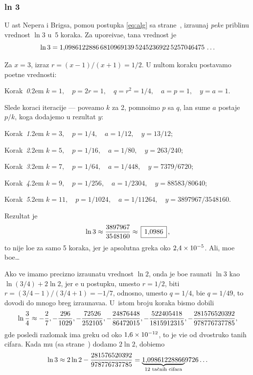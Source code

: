 \subsubsection{ln 3}\label{sssec:ln3}
 
\zadatak
U {\cv}ast Nepera i Brigsa,
pomo{\cc}u postupka \eqref{eq:alg} sa 
strane~\pageref{eq:alg},
izra{\cv}unaj {\sl pe{\sv}ke\/} pribli{\zv}nu vrednost $\ln 3$
u~5 koraka. Za upore{\dj}iva{\nj}e, ta{\cv}na vrednost je
$$
\ln3=1\.
0986122886\,
6810969139\,
5245236922\,
5257046475\,\ldots
$$

\def\step#1{\par\indent\leavevmode
  Korak~{\it#1}.\kern2em\relax}

\resenje
Za $x=3$, izraz $r=(x-1)/(x+1)=1/2$. U nultom koraku postav{\lj}amo po{\cv}etne vrednosti:

\smallskip

\step0 $k=1,\quad p=2r=1,\quad q=r^2=1/4,\quad a=p=1,\quad y=a=1$.

\smallskip

\noindent Slede koraci iteracije --- pove{\cc}amo $k$ za 2, pomno{\zv}imo $p$ sa $q$,
{\cv}lan sume $a$ postaje $p/k$, koga dodajemo u rezultat $y$:

\smallskip

\step1 $k=3,\quad p=1/4,\quad a=1/12,\quad y=13/12$;
\step2 $k=5,\quad p=1/16,\quad a=1/80,\quad y=263/240$;
\step3 $k=7,\quad p=1/64,\quad a=1/448,\quad y=7379/6720$;
\step4 $k=9,\quad p=1/256,\quad a=1/2304,\quad y=88583/80640$;
\step5 $k=11,\quad p=1/1024,\quad a=1/11264,\quad y=3897967/3548160$.

\smallskip

\noindent Rezultat je
$$
\ln3\approx\frac{3897967}{3548160}\approx \ram{1\.0986},
$$
{\sv}to nije lo{\sv}e za samo 5 koraka, jer je apsolutna gre{\sv}ka oko $2\.4\puta10^{-5}$.
Ali, mo{\zv}e bo{\lj}e\dots

\dodatak
Ako ve{\cc} imamo precizno izra{\cv}unatu vrednost $\ln2$, onda je bo{\lj}e ra{\cv}unati $\ln3$ kao $\ln(3/4)+2\ln2$,
jer {\cc}e u postupku, umesto $r=1/2$, biti $r=(3/4-1)/(3/4+1)=-1/7$, 
odnosno, umesto $q=1/4$, bi{\cc}e $q=1/49$,
{\sv}to dovodi do mnogo br{\zv}eg izra{\cv}unava{\nj}a. U~istom broju koraka bismo dobili
$$
\ln\frac34\approx
-\ff2/7, -\ff296/1029, -\ff72526/252105, -\ff24876448/86472015, 
-\ff522405418/1815912315, -\ff281576520392/978776737785,
$$
gde posled{\nj}i razlomak ima gre{\sv}ku od oko $1\.6\puta10^{-12}$,
{\sv}to je vi{\sv}e od dvostruko ta{\cv}nih cifara.
Kada mu (sa strane~\pageref{eq:ln2}) dodamo $2\ln2$, dobi{\cc}emo
$$\ln3\approx 2\ln2 -\frac{281576520392}{978776737785} =
\underbrace{1\.09861228866}_{\hbox{\scriptsize 12 ta{\cv}nih cifara}}\!9726\ldots$$

